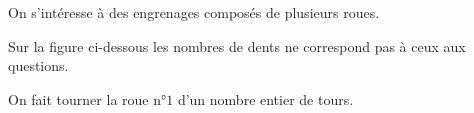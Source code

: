 \begin{exercice*}
    \newcommand{\roue}[4]{%
        \foreach \i in {1,2,...,#2}
        {
        \pgfmathparse{360*(\i-1)/#2}\let\angle\pgfmathresult

        \begin{scope}[shift={(#3,#4)}]
        \pgfmathparse{#1*cos(90+360/(#2*4))}\let\Ax\pgfmathresult 
        \pgfmathparse{#1*sin(90+360/(#2*4))}\let\Ay\pgfmathresult

        \pgfmathparse{#1*cos(90-360/(#2*4))}\let\Bx\pgfmathresult
        \pgfmathparse{#1*sin(90-360/(#2*4))}\let\By\pgfmathresult

        \pgfmathparse{4*#1*cos(90+360/(#2*8))/3}\let\Cx\pgfmathresult
        \pgfmathparse{4*#1*sin(90+360/(#2*8))/3}\let\Cy\pgfmathresult

        \pgfmathparse{4*#1*cos(90-360/(#2*8))/3}\let\Dx\pgfmathresult
        \pgfmathparse{4*#1*sin(90-360/(#2*8))/3}\let\Dy\pgfmathresult

        \pgfmathparse{90-360/(#2*4)}\let\a\pgfmathresult
        \pgfmathparse{90-1.5*360/(#2*2)}\let\b\pgfmathresult

        \draw[rotate=\angle] (\Ax,\Ay) to[bend left=15] (\Cx,\Cy) -- (\Dx,\Dy) to[bend left=15] (\Bx,\By) arc (\a:\b:#1cm); 
        
        \end{scope}
        }
    }

    On s'intéresse à des engrenages composés de plusieurs roues.

    Sur la figure ci-dessous les nombres de dents ne correspond pas à ceux aux questions.

    On fait tourner la roue n°$1$ d'un nombre entier de tours.



\end{exercice*}
